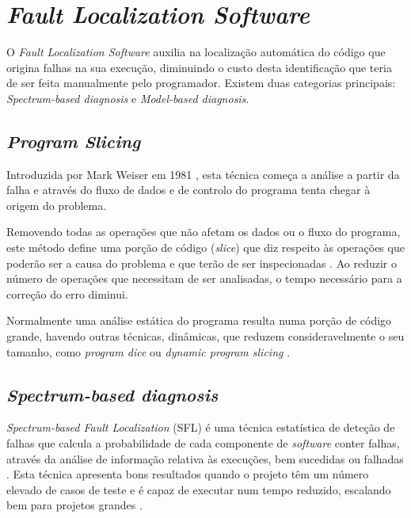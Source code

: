 \section{\emph{Fault Localization Software}}

O \emph{Fault Localization Software} auxilia na localização automática do código que origina falhas na sua execução, diminuindo o custo desta identificação que teria de ser feita manualmente pelo programador. Existem duas categorias principais: \emph{Spectrum-based diagnosis} e \emph{Model-based diagnosis}.

% 
%

\subsection{\emph{Program Slicing}}

Introduzida por Mark Weiser em 1981 \cite{Weiser1981, Weiser1982}, esta técnica começa a análise a partir da falha e através do fluxo de dados e de controlo do programa tenta chegar à origem do problema. 

Removendo todas as operações que não afetam os dados ou o fluxo do programa, este método define uma porção de código (\emph{slice}) que diz respeito às operações que poderão ser a causa do problema e que terão de ser inspecionadas \cite{Perez2004}. Ao reduzir o número de operações que necessitam de ser analisadas, o tempo necessário para a correção do erro diminui.

Normalmente uma análise estática do programa resulta numa porção de código grande, havendo outras técnicas, dinâmicas, que reduzem consideravelmente o seu tamanho, como \emph{program dice} ou \emph{dynamic program slicing} \cite{Perez2004}.

% 
%

\subsection{\emph{Spectrum-based diagnosis}}

\emph{Spectrum-based Fault Localization} (SFL) é uma técnica estatística de deteção de falhas  que calcula a probabilidade de cada componente de \emph{software} conter falhas, através da análise de informação relativa às execuções, bem sucedidas ou falhadas \cite{Abreu2007}. Esta técnica apresenta bons resultados quando o projeto têm um número elevado de casos de teste e é capaz de executar num tempo reduzido, escalando bem para projetos grandes \cite{Mayer2008}.

